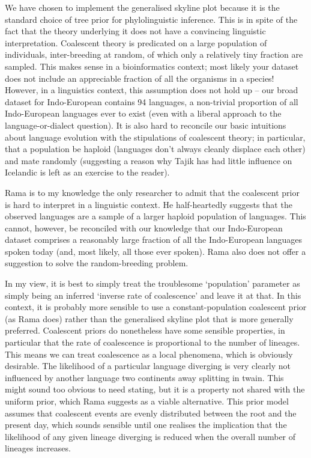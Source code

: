 \documentclass[10pt,journal,compsoc]{IEEEtran}
\begin{document}
We have chosen to implement the generalised skyline plot because it is the standard choice of tree prior for phylolinguistic inference. This is in spite of the fact that the theory underlying it does not have a convincing linguistic interpretation. Coalescent theory is predicated on a large population of individuals, inter-breeding at random, of which only a relatively tiny fraction are sampled. This makes sense in a bioinformatics context; most likely your dataset does not include an appreciable fraction of all the organisms in a species! However, in a linguistics context, this assumption does not hold up -- our broad dataset for Indo-European contains 94 languages, a non-trivial proportion of all Indo-European languages ever to exist (even with a liberal approach to the language-or-dialect question). It is also hard to reconcile our basic intuitions about language evolution with the stipulations of coalescent theory; in particular, that a population be haploid (languages don't always cleanly displace each other) and mate randomly (suggesting a reason why Tajik has had little influence on Icelandic is left as an exercise to the reader).

Rama is to my knowledge the only researcher to admit that the coalescent prior is hard to interpret in a linguistic context. He half-heartedly suggests that the observed languages are a sample of a larger haploid population of languages. This cannot, however, be reconciled with our knowledge that our Indo-European dataset comprises a reasonably large fraction of all the Indo-European languages spoken today (and, most likely, all those ever spoken). Rama also does not offer a suggestion to solve the random-breeding problem.

In my view, it is best to simply treat the troublesome `population' parameter as simply being an inferred `inverse rate of coalescence' and leave it at that. In this context, it is probably more sensible to use a constant-population coalescent prior (as Rama does) rather than the generalised skyline plot that is more generally preferred. Coalescent priors do nonetheless have some sensible properties, in particular that the rate of coalescence is proportional to the number of lineages. This means we can treat coalescence as a local phenomena, which is obviously desirable. The likelihood of a particular language diverging is very clearly not influenced by another language two continents away splitting in twain. This might sound too obvious to need stating, but it is a property not shared with the uniform prior, which Rama suggests as a viable alternative. This prior model assumes that coalescent events are evenly distributed between the root and the present day, which sounds sensible until one realises the implication that the likelihood of any given lineage diverging is reduced when the overall number of lineages increases.
\end{document}
